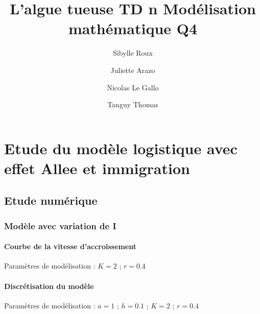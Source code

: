 \documentclass{article}
\begin{document}
\title{L'algue tueuse
	\smallbreak
	TD n
	\smallbreak
	Modélisation mathématique
	\smallbreak
	Q4}
\author{Sibylle Roux \and Juliette Arazo \and Nicolas Le Gallo \and Tanguy Thomas}


\maketitle

\newpage

\tableofcontents

\newpage

\section{Etude du modèle logistique avec effet Allee et immigration}

\subsection{Etude numérique}

\subsubsection{Modèle avec variation de I}

\paragraph{Courbe de la vitesse d'accroissement}
\begin{center}
\end{center}
Paramètres de modélisation : $K=2$  ; $r=0.4$ 
\paragraph{}

\newpage

\paragraph{Discrétisation du modèle}
\begin{center}
\end{center}
Paramètres de modélisation : $a=1$ ; $h=0.1$ ; $K=2$  ; $r=0.4$
\paragraph{}
\end{document}

